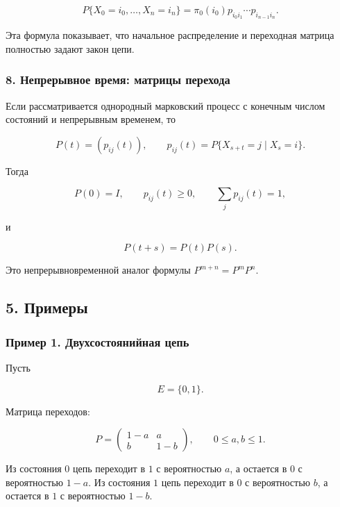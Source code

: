 \documentclass[
  11pt,
  a4paper,
]{article}
\begin{document}
\[
P\{X_0=i_0,\ldots,X_n=i_n\}
=
\pi_0(i_0)p_{i_0i_1}\cdots p_{i_{n-1}i_n}.
\]

Эта формула показывает, что начальное распределение и переходная матрица
полностью задают закон цепи.

\subsubsection{8. Непрерывное время: матрицы
перехода}\label{ux43dux435ux43fux440ux435ux440ux44bux432ux43dux43eux435-ux432ux440ux435ux43cux44f-ux43cux430ux442ux440ux438ux446ux44b-ux43fux435ux440ux435ux445ux43eux434ux430}

Если рассматривается однородный марковский процесс с конечным числом
состояний и непрерывным временем, то

\[
P(t)=(p_{ij}(t)),
\qquad
p_{ij}(t)=P\{X_{s+t}=j\mid X_s=i\}.
\]

Тогда

\[
P(0)=I,
\qquad
p_{ij}(t)\ge0,
\qquad
\sum_jp_{ij}(t)=1,
\]

и

\[
P(t+s)=P(t)P(s).
\]

Это непрерывновременной аналог формулы \(P^{m+n}=P^mP^n\).

\subsection{5. Примеры}\label{ux43fux440ux438ux43cux435ux440ux44b}

\subsubsection{Пример 1. Двухсостоянийная
цепь}\label{ux43fux440ux438ux43cux435ux440-1.-ux434ux432ux443ux445ux441ux43eux441ux442ux43eux44fux43dux438ux439ux43dux430ux44f-ux446ux435ux43fux44c}

Пусть

\[
E=\{0,1\}.
\]

Матрица переходов:

\[
P=
\begin{pmatrix}
1-a & a\\
b & 1-b
\end{pmatrix},
\qquad
0\le a,b\le1.
\]

Из состояния \(0\) цепь переходит в \(1\) с вероятностью \(a\), а
остается в \(0\) с вероятностью \(1-a\). Из состояния \(1\) цепь
переходит в \(0\) с вероятностью \(b\), а остается в \(1\) с
вероятностью \(1-b\).
\end{document}
